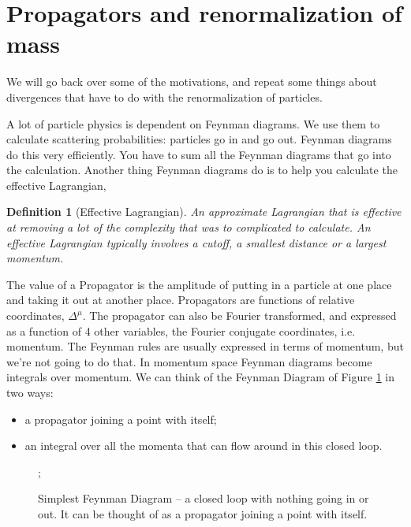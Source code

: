 \documentclass[]{article}
\newtheorem{defn}[thm]{Definition}
\begin{document}
\section{Propagators and renormalization of mass}

We will go back over some of the motivations, and repeat some things about divergences that have to do with the renormalization of particles.

A lot of particle physics is dependent on Feynman diagrams. We use them to calculate scattering probabilities: particles go in and go out. Feynman diagrams do this very efficiently. You have to sum all the Feynman diagrams that go into the calculation. Another thing Feynman diagrams do is to help you calculate the effective Lagrangian, 

\begin{defn}[Effective Lagrangian]
	An approximate Lagrangian that is effective at removing a lot of the complexity that was to complicated to calculate. An effective Lagrangian typically involves a cutoff, a smallest distance or a largest momentum.
\end{defn}

The value of a Propagator is the amplitude of putting in a particle at one place and taking it out at another place. Propagators are functions of relative coordinates, $\Delta^\mu$. The propagator can also be Fourier transformed, and expressed as a function of 4 other variables, the Fourier conjugate coordinates, i.e. momentum. The Feynman rules are usually expressed in terms of momentum, but we're not going to do that. In momentum space Feynman diagrams become integrals over momentum. We can think of the Feynman Diagram of Figure \ref{fig:particles3-3-feynman-loop} in two ways:
\begin{itemize}
	\item a propagator joining a point with itself;
	\item an integral over all the momenta that can flow around in this closed loop.
\end{itemize}

\begin{figure}[H]
	\begin{center}
		\caption[Simplest Feynman Diagram -- a closed loop]{Simplest Feynman Diagram -- a closed loop with nothing going in or out. It can be thought of as a propagator joining a point with itself.}\label{fig:particles3-3-feynman-loop}
		;
	\end{center}
\end{figure}
\end{document}
